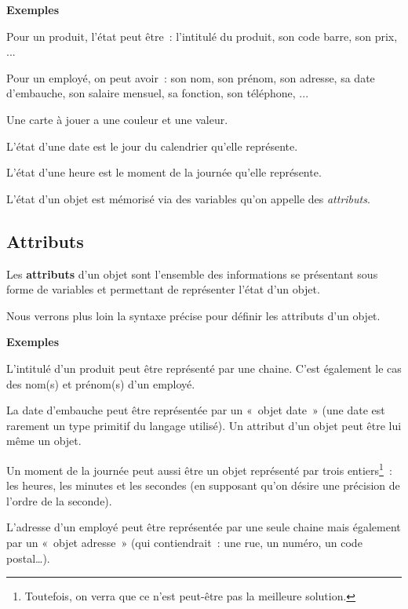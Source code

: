 		\textbf{Exemples}	
		\begin{liste}
		\item 
			Pour un produit, l'état peut être~:
			l'intitulé du produit, son code barre, son prix, ... 
		\item 
			Pour un employé, on peut avoir~: son nom, son prénom, son adresse, sa
			date d'embauche, son salaire mensuel, sa fonction, son
			téléphone, ... 
		\item 
			Une carte à jouer a une couleur et une valeur.
		\item 
			L'état d'une date est le jour du
			calendrier qu'elle représente.
		\item 
			L'état d'une heure est le moment de la
			journée qu'elle représente.
		\end{liste}

		L'état d'un objet est mémorisé via des
		variables qu'on appelle des \textit{attributs}.

	\subsection{Attributs}

		Les \textbf{attributs} d'un objet sont
		l'ensemble des informations se présentant sous forme
		de variables et permettant de représenter l'état
		d'un objet.

		Nous verrons plus loin la syntaxe précise 
		pour définir les attributs d'un objet.

		\textbf{Exemples}
		\begin{liste}
		\item 
			L'intitulé d'un produit peut être
			représenté par une chaine. C'est également le cas des
			nom(s) et prénom(s) d'un employé.
		\item 
			La date d'embauche peut être représentée par un «~objet
			date~» (une date est rarement un type primitif du langage utilisé). Un
			attribut d'un objet peut être lui même un objet.
		\item 
			Un moment de la journée peut aussi être un objet représenté par trois
			entiers\footnote{Toutefois, on verra que ce n'est
			peut-être pas la meilleure solution.}~: les heures, les minutes et les
			secondes (en supposant qu'on désire une précision de
			l'ordre de la seconde).
		\item 
			L'adresse d'un employé peut être
			représentée par une seule chaine mais également par un «~objet
			adresse~» (qui contiendrait~: une rue, un numéro, un code postal\dots).
		\end{liste}

